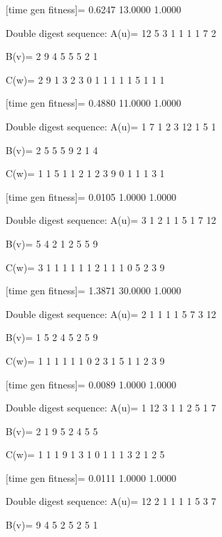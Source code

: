 [time gen fitness]=
    0.6247   13.0000    1.0000

Double digest sequence:
A(u)=
    12     5     3     1     1     1     1     7     2

B(v)=
     2     9     4     5     5     5     2     1

C(w)=
     2     9     1     3     2     3     0     1     1     1     1     1     5     1     1     1

[time gen fitness]=
    0.4880   11.0000    1.0000

Double digest sequence:
A(u)=
     1     7     1     2     3    12     1     5     1

B(v)=
     2     5     5     5     9     2     1     4

C(w)=
     1     1     5     1     1     2     1     2     3     9     0     1     1     1     3     1

[time gen fitness]=
    0.0105    1.0000    1.0000

Double digest sequence:
A(u)=
     3     1     2     1     1     5     1     7    12

B(v)=
     5     4     2     1     2     5     5     9

C(w)=
     3     1     1     1     1     1     1     2     1     1     1     0     5     2     3     9

[time gen fitness]=
    1.3871   30.0000    1.0000

Double digest sequence:
A(u)=
     2     1     1     1     1     5     7     3    12

B(v)=
     1     5     2     4     5     2     5     9

C(w)=
     1     1     1     1     1     1     0     2     3     1     5     1     1     2     3     9

[time gen fitness]=
    0.0089    1.0000    1.0000

Double digest sequence:
A(u)=
     1    12     3     1     1     2     5     1     7

B(v)=
     2     1     9     5     2     4     5     5

C(w)=
     1     1     1     9     1     3     1     0     1     1     1     3     2     1     2     5

[time gen fitness]=
    0.0111    1.0000    1.0000

Double digest sequence:
A(u)=
    12     2     1     1     1     1     5     3     7

B(v)=
     9     4     5     2     5     2     5     1

